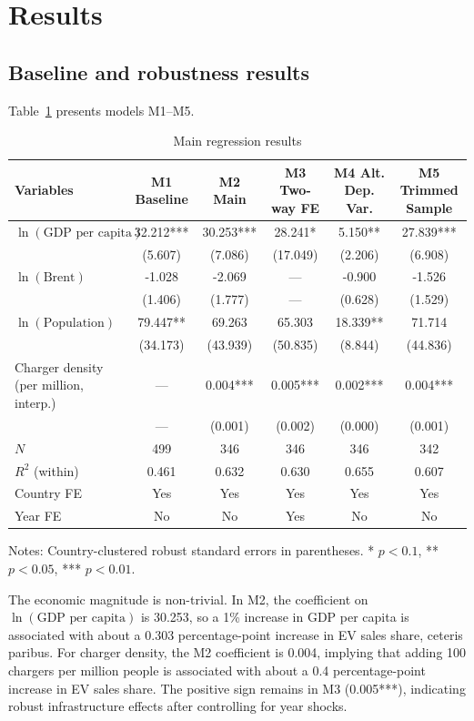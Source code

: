 \documentclass[a4paper,12pt]{article}
\begin{document}
\section{Results}
\subsection{Baseline and robustness results}
Table~\ref{tab:main} presents models M1--M5.

\begin{table}[H]
\centering
\caption{Main regression results}
\label{tab:main}
\begin{threeparttable}
\begin{tabular}{lccccc}
\toprule
Variables & M1 Baseline & M2 Main & M3 Two-way FE & M4 Alt. Dep. Var. & M5 Trimmed Sample \\
\midrule
$\ln(\text{GDP per capita})$ & 32.212*** & 30.253*** & 28.241* & 5.150** & 27.839*** \\
 & (5.607) & (7.086) & (17.049) & (2.206) & (6.908) \\
$\ln(\text{Brent})$ & -1.028 & -2.069 & --- & -0.900 & -1.526 \\
 & (1.406) & (1.777) & --- & (0.628) & (1.529) \\
$\ln(\text{Population})$ & 79.447** & 69.263 & 65.303 & 18.339** & 71.714 \\
 & (34.173) & (43.939) & (50.835) & (8.844) & (44.836) \\
Charger density (per million, interp.) & --- & 0.004*** & 0.005*** & 0.002*** & 0.004*** \\
 & --- & (0.001) & (0.002) & (0.000) & (0.001) \\
\midrule
$N$ & 499 & 346 & 346 & 346 & 342 \\
$R^2$ (within) & 0.461 & 0.632 & 0.630 & 0.655 & 0.607 \\
Country FE & Yes & Yes & Yes & Yes & Yes \\
Year FE & No & No & Yes & No & No \\
\bottomrule
\end{tabular}
\begin{tablenotes}
\footnotesize
\item Notes: Country-clustered robust standard errors in parentheses. * $p<0.1$, ** $p<0.05$, *** $p<0.01$.
\end{tablenotes}
\end{threeparttable}
\end{table}

The economic magnitude is non-trivial. In M2, the coefficient on $\ln(\text{GDP per capita})$ is 30.253, so a 1\% increase in GDP per capita is associated with about a 0.303 percentage-point increase in EV sales share, ceteris paribus. For charger density, the M2 coefficient is 0.004, implying that adding 100 chargers per million people is associated with about a 0.4 percentage-point increase in EV sales share. The positive sign remains in M3 (0.005***), indicating robust infrastructure effects after controlling for year shocks.
\end{document}
